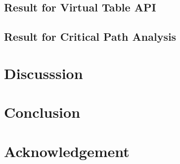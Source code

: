 \subsection{Result for Virtual Table API}

\subsection{Result for Critical Path Analysis}

\section{Discusssion}

\section{Conclusion}

\section{Acknowledgement}